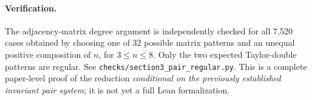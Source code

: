 \documentclass[11pt,a4paper]{article}
\begin{document}
\paragraph{Verification.}
The adjacency-matrix degree argument is
independently checked for all 7,520
cases obtained by choosing one of 32 possible
matrix patterns and an unequal positive
composition of \(n\), for \(3\le n\le8\).
Only the two expected Taylor-double patterns
are regular. See
\texttt{checks/section3\_pair\_regular.py}.
This is a complete paper-level proof of
the reduction \emph{conditional on the previously
established invariant pair system};
it is not yet a full Lean formalization.
\end{document}
